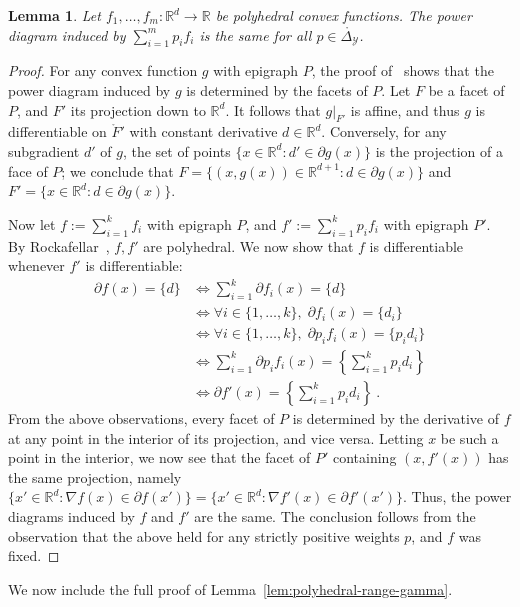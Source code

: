 \documentclass[12pt]{article}
\newcommand{\reals}{\mathbb{R}}
\newcommand{\simplex}{\Delta_\Y}
\newcommand{\Y}{\mathcal{Y}}
\newcommand{\inter}[1]{\mathring{#1}}%
\newtheorem{lemma}{Lemma}
\begin{document}
\begin{lemma}\label{lem:polyhedral-pd-same}
	Let $f_1,\ldots,f_m:\reals^d\to\reals$ be polyhedral convex functions.
	The power diagram induced by $\sum_{i=1}^m p_i f_i$ is the same for all $p \in \inter\simplex$.
\end{lemma}
\begin{proof}
	For any convex function $g$ with epigraph $P$, the proof of~\citet[Theorem 4]{aurenhammer1987power} shows that the power diagram induced by $g$ is determined by the facets of $P$.
	Let $F$ be a facet of $P$, and $F'$ its projection down to $\reals^d$.
	It follows that $g|_{F'}$ is affine, and thus $g$ is differentiable on $\inter F'$ with constant derivative $d\in\reals^d$.
	Conversely, for any subgradient $d'$ of $g$, the set of points $\{x\in\reals^d : d'\in\partial g(x)\}$ is the projection of a face of $P$; we conclude that $F = \{(x,g(x))\in\reals^{d+1} : d\in\partial g(x)\}$ and $F' = \{x\in\reals^d : d\in\partial g(x)\}$.
	
	Now let $f := \sum_{i=1}^k f_i$ with epigraph $P$, and $f' := \sum_{i=1}^k p_i f_i$ with epigraph $P'$.
	By Rockafellar~\cite{rockafellar1997convex}, $f,f'$ are polyhedral.
	We now show that $f$ is differentiable whenever $f'$ is differentiable:
	\begin{align*}
	\partial f(x) = \{d\}
	&\iff \sum_{i=1}^k \partial f_i(x) = \{d\} \\
	&\iff \forall i\in\{1,\ldots,k\}, \; \partial f_i(x) = \{d_i\} \\
	&\iff \forall i\in\{1,\ldots,k\}, \; \partial p_i f_i(x) = \{p_id_i\} \\
	&\iff \sum_{i=1}^k \partial p_if_i(x) = \left\{\sum_{i=1}^k p_id_i\right\} \\
	&\iff \partial f'(x) = \left\{\sum_{i=1}^k p_id_i\right\}~.
	\end{align*}
	From the above observations, every facet of $P$ is determined by the derivative of $f$ at any point in the interior of its projection, and vice versa.
	Letting $x$ be such a point in the interior, we now see that the facet of $P'$ containing $(x,f'(x))$ has the same projection, namely $\{x'\in\reals^d : \nabla f(x) \in \partial f(x')\} = \{x'\in\reals^d : \nabla f'(x) \in \partial f'(x')\}$.
	Thus, the power diagrams induced by $f$ and $f'$ are the same.
	The conclusion follows from the observation that the above held for any strictly positive weights $p$, and $f$ was fixed.
\end{proof}

We now include the full proof of Lemma~\ref{lem:polyhedral-range-gamma}.
\end{document}
